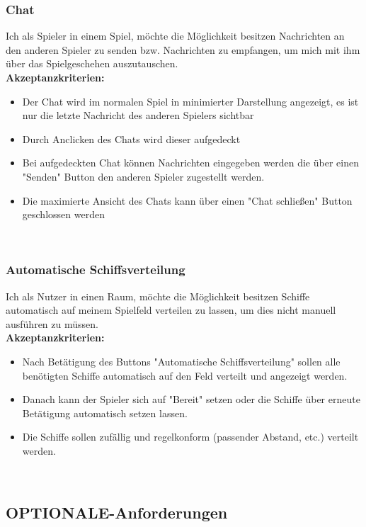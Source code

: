 \documentclass[conference]{IEEEtran}
\begin{document}
    \subsubsection{Chat}
    Ich als Spieler in einem Spiel, möchte die Möglichkeit besitzen Nachrichten an den anderen Spieler zu senden bzw. Nachrichten zu empfangen, um mich mit ihm über das Spielgeschehen auszutauschen. \\
    \textbf{Akzeptanzkriterien:}
    \begin{itemize}
        \item Der Chat wird im normalen Spiel in minimierter Darstellung angezeigt, es ist nur die letzte Nachricht des anderen Spielers sichtbar
        \item Durch Anclicken des Chats wird dieser aufgedeckt
        \item Bei aufgedeckten Chat können Nachrichten eingegeben werden die über einen "Senden" Button den anderen Spieler zugestellt werden. 
        \item Die maximierte Ansicht des Chats kann über einen "Chat schließen" Button geschlossen werden
    \end{itemize}
    \ \\
    \subsubsection{Automatische Schiffsverteilung}
    Ich als Nutzer in einen Raum, möchte die Möglichkeit besitzen Schiffe automatisch auf meinem Spielfeld verteilen zu lassen, um dies nicht manuell ausführen zu müssen. \\
    \textbf{Akzeptanzkriterien:}
    \begin{itemize}
        \item Nach Betätigung des Buttons "Automatische Schiffsverteilung" sollen alle benötigten Schiffe automatisch auf den Feld verteilt und angezeigt werden.
        \item Danach kann der Spieler sich auf "Bereit" setzen oder die Schiffe über erneute Betätigung automatisch setzen lassen.
        \item Die Schiffe sollen zufällig und regelkonform (passender Abstand, etc.) verteilt werden.
    \end{itemize}
    \ \\
    \subsection{OPTIONALE-Anforderungen}
    \ \\
\end{document}
